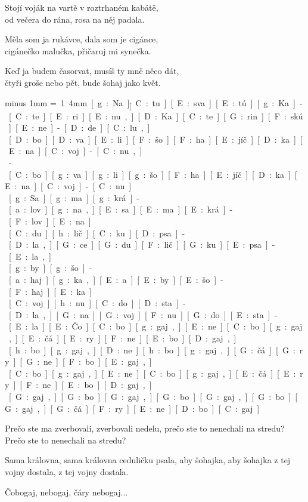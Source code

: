 Stojí voják na vartě v roztrhaném kabátě, \\
od večera do rána, rosa na něj padala.

Měla som ja rukávce, dala som je cigánce, \\
cigánečko malučka, přičaruj mi synečka.

Keď ja budem časorvat, musíš ty mně něco dát, \\
čtyři groše nebo pět, bude šohaj jako květ.



{\pskip=2mm minus 1mm
\unit=1.4mm
[g:Na]_ [C:tu] [E:sva][E:tú] [g:Ka]-[C:te][E:ri][E:nu,]
[D:Ka][C:te][G:rin][F:skú] [E:ne]-[D:de][C:lu,]\\
[D:ver][D:bo][D:va][E:li] [F:šo][F:ha][E:jíč][D:ka] [E:na] [C:voj]-[C:nu,] \\
[E:ver]-[C:bo][g:va][g:li] [g:šo][F:ha][E:jíč][D:ka] [E:na] [C:voj]-[C:nu.] \\

[g:Sa][g:ma] [g:krá]-[a:lov][g:na,] [E:sa][E:ma] [E:krá]-[F:lov][E:na]\\
[D:ce][C:du][h:lič][C:ku] [D:psa]-[D:la,]
[G:ce][G:du][F:lič][G:ku] [E:psa]-[E:la,]\\
[g:a][g:by] [g:šo]-[a:haj][g:ka,] [E:a][E:by] [E:šo]-[F:haj][E:ka]\\
[D:na] [C:voj][h:nu] [C:do][D:sta]-[D:la,]
[G:na] [G:voj][F:nu] [G:do][E:sta]-[E:la.]

[E:Čo][C:bo][g:gaj,] [E:ne][C:bo][g:gaj,] [E:čá][E:ry] [F:ne][E:bo][D:gaj,]\\
[D:čo][h:bo][g:gaj,] [D:ne][h:bo][g:gaj,] [G:čá][G:ry] [G:ne][F:bo][E:gaj,]\\
[E:čo][C:bo][g:gaj,] [E:ne][C:bo][g:gaj,] [E:čá][E:ry] [F:ne][E:bo][D:gaj,]\\
[G:bo][G:gaj,] [G:bo][G:gaj,] [G:bo][G:gaj,] [G:bo][G:gaj,]
[G:čá][F:ry] [E:ne][D:bo][C:gaj.]\\
}

Prečo ste ma zverbovali, zverbovali nedelu,
prečo ste to nenechali na stredu?
Prečo ste to nenechali na stredu?

Sama královna, sama královna ceduličku psala,
aby šohajka, aby šohajka z tej vojny dostala, z tej vojny dostala.

Čobogaj, nebogaj, čáry nebogaj...

\bye
